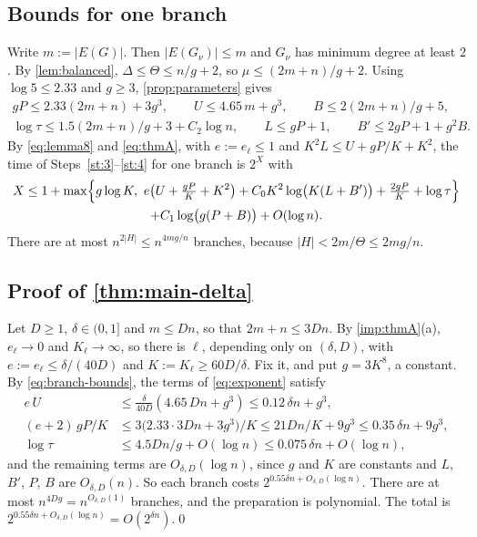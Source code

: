 \documentclass[11pt]{amsart}
\theoremstyle{plain}
\theoremstyle{definition}
\theoremstyle{remark}
\numberwithin{equation}{section}
\begin{document}
\subsection{Bounds for one branch}
Write $m:=|E(G)|$. Then $|E(G_\nu)|\le m$ and $G_\nu$ has minimum degree at least $2$. By
\cref{lem:balanced}, $\Delta\le\Theta\le n/g+2$, so $\mu\le(2m+n)/g+2$. Using $\log5\le2.33$ and
$g\ge3$, \cref{prop:parameters} gives
\begin{equation}\label{eq:branch-bounds}
\begin{gathered}
  gP\le2.33(2m+n)+3g^3,\qquad U\le4.65\,m+g^3,\qquad B\le 2(2m+n)/g+5,\\
  \log\tau\le1.5(2m+n)/g+3+C_2\log n,\qquad L\le gP+1,\qquad B'\le2gP+1+g^2B .
\end{gathered}
\end{equation}
By \eqref{eq:lemma8} and \eqref{eq:thmA}, with $e:=e_\ell\le1$ and $K^2L\le U+gP/K+K^2$, the time of
Steps~\ref{st:3}--\ref{st:4} for one branch is $2^X$ with
\begin{multline}\label{eq:exponent}
  X\le1+\max\Bigl\{g\log K,\ e\bigl(U+\tfrac{gP}{K}+K^2\bigr)+C_0K^2\log\bigl(K(L+B')\bigr)+\tfrac{2gP}{K}+\log\tau\Bigr\}\\
  +C_1\log\bigl(g(P+B)\bigr)+O(\log n).
\end{multline}
There are at most $n^{2|H|}\le n^{4mg/n}$ branches, because $|H|<2m/\Theta\le2mg/n$.

\subsection{Proof of \texorpdfstring{\cref{thm:main-delta}}{Theorem 1.1}}\label{sec:proof-delta}
Let $D\ge1$, $\delta\in(0,1]$ and $m\le Dn$, so that $2m+n\le3Dn$. By \cref{imp:thmA}(a),
$e_\ell\to0$ and $K_\ell\to\infty$, so there is $\ell$, depending only on $(\delta,D)$, with
$e:=e_\ell\le\delta/(40D)$ and $K:=K_\ell\ge60D/\delta$. Fix it, and put $g=3K^8$, a constant. By
\eqref{eq:branch-bounds}, the terms of \eqref{eq:exponent} satisfy
\begin{align*}
  e\,U&\le\tfrac{\delta}{40D}(4.65\,Dn+g^3)\le0.12\,\delta n+g^3,\\
  (e+2)\,gP/K&\le3\bigl(2.33\cdot3Dn+3g^3\bigr)/K\le21Dn/K+9g^3\le0.35\,\delta n+9g^3,\\
  \log\tau&\le4.5Dn/g+O(\log n)\le0.075\,\delta n+O(\log n),
\end{align*}
and the remaining terms are $O_{\delta,D}(\log n)$, since $g$ and $K$ are constants and $L$, $B'$,
$P$, $B$ are $O_{\delta,D}(n)$. So each branch costs $2^{0.55\delta n+O_{\delta,D}(\log n)}$. There
are at most $n^{4Dg}=n^{O_{\delta,D}(1)}$ branches, and the preparation is polynomial. The total
is $2^{0.55\delta n+O_{\delta,D}(\log n)}=O(2^{\delta n})$.\qed
\end{document}
